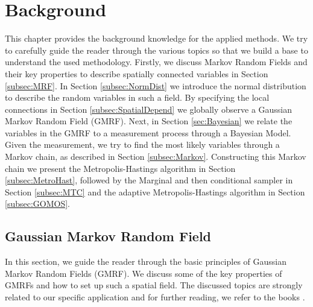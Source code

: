 





\chapter{\label{ch:2-litreview}Background}
This chapter provides the background knowledge for the applied methods.
We try to carefully guide the reader through the various topics so that we build a base to understand the used methodology.
Firstly, we discuss Markov Random Fields and their key properties to describe spatially connected variables in Section \ref{subsec:MRF}.
In Section \ref{subsec:NormDist} we introduce the normal distribution to describe the random variables in such a field.
By specifying the local connections in Section \ref{subsec:SpatialDepend} we globally observe a Gaussian Markov Random Field (GMRF).
Next, in Section \ref{sec:Bayesian} we relate the variables in the GMRF to a measurement process through a Bayesian Model.
Given the measurement, we try to find the most likely variables through a Markov chain, as described in Section \ref{subsec:Markov}.
Constructing this Markov chain we present the Metropolis-Hastings algorithm in Section \ref{subsec:MetroHast}, followed by the Marginal and then conditional sampler in Section \ref{subsec:MTC} and the adaptive Metropolis-Hastings algorithm in Section \ref{subsec:GOMOS}. 



\section{Gaussian Markov Random Field}
In this section, we guide the reader through the basic principles of Gaussian Markov Random Fields (GMRF).
We discuss some of the key properties of GMRFs and how to set up such a spatial field.
The discussed topics are strongly related to our specific application and for further reading, we refer to the books \cite{rue2005gaussian, higdon2006primer}.

